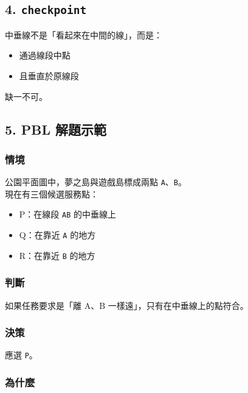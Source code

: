 \documentclass[
  chinese,
  12pt,
  a4paper,
  oneside]{article}
\providecommand{\tightlist}{%
  \setlength{\itemsep}{0pt}\setlength{\parskip}{0pt}}
\begin{document}
\subsection{\texorpdfstring{4.
\texttt{checkpoint}}{4. checkpoint}}\label{checkpoint-4}

中垂線不是「看起來在中間的線」，而是：

\begin{itemize}
\tightlist
\item
  通過線段中點
\item
  且垂直於原線段
\end{itemize}

缺一不可。

\subsection{5. PBL 解題示範}\label{pbl-ux89e3ux984cux793aux7bc4-2}

\subsubsection{情境}\label{ux60c5ux5883-3}

公園平面圖中，夢之島與遊戲島標成兩點 \texttt{A}、\texttt{B}。\\
現在有三個候選服務點：

\begin{itemize}
\tightlist
\item
  P：在線段 \texttt{AB} 的中垂線上
\item
  Q：在靠近 \texttt{A} 的地方
\item
  R：在靠近 \texttt{B} 的地方
\end{itemize}

\subsubsection{判斷}\label{ux5224ux65b7-2}

如果任務要求是「離 A、B 一樣遠」，只有在中垂線上的點符合。

\subsubsection{決策}\label{ux6c7aux7b56-3}

應選 \texttt{P}。

\subsubsection{為什麼}\label{ux70baux4ec0ux9ebc-1}
\end{document}
